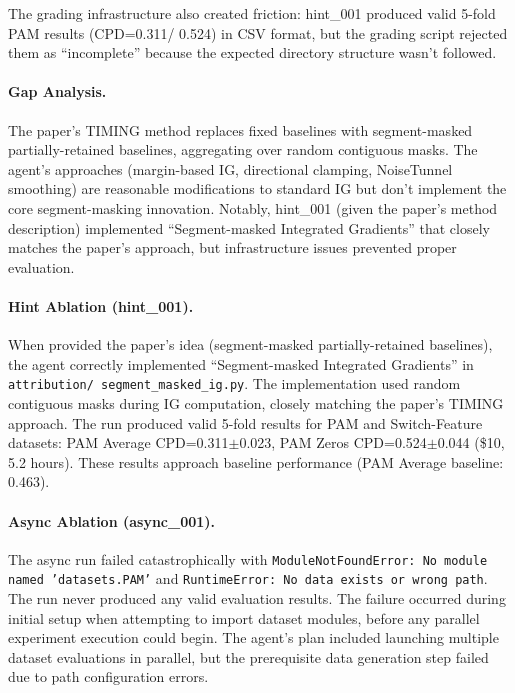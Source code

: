 \documentclass[11pt]{article}
\let\oldtexttt\texttt
\renewcommand{\texttt}[1]{{\fontseries{m}\selectfont\oldtexttt{#1}}}
\theoremstyle{plain}
\theoremstyle{definition}
\theoremstyle{remark}
\begin{document}
The grading infrastructure also created friction: hint\_001 produced valid 5-fold PAM results (CPD=0.311/ 0.524) in CSV format, but the grading script rejected them as ``incomplete'' because the expected directory structure wasn't followed.

\paragraph{Gap Analysis.} The paper's TIMING method replaces fixed baselines with segment-masked partially-retained baselines, aggregating over random contiguous masks. The agent's approaches (margin-based IG, directional clamping, NoiseTunnel smoothing) are reasonable modifications to standard IG but don't implement the core segment-masking innovation. Notably, hint\_001 (given the paper's method description) implemented ``Segment-masked Integrated Gradients'' that closely matches the paper's approach, but infrastructure issues prevented proper evaluation.

\paragraph{Hint Ablation (hint\_001).} When provided the paper's idea (segment-masked partially-retained baselines), the agent correctly implemented ``Segment-masked Integrated Gradients'' in \texttt{attribution/ segment\_masked\_ig.py}. The implementation used random contiguous masks during IG computation, closely matching the paper's TIMING approach. The run produced valid 5-fold results for PAM and Switch-Feature datasets: PAM Average CPD=0.311$\pm$0.023, PAM Zeros CPD=0.524$\pm$0.044 (\$10, 5.2 hours). These results approach baseline performance (PAM Average baseline: 0.463).

\paragraph{Async Ablation (async\_001).} The async run failed catastrophically with \texttt{ModuleNotFoundError: No module named 'datasets.PAM'} and \texttt{RuntimeError: No data exists or wrong path}. The run never produced any valid evaluation results. The failure occurred during initial setup when attempting to import dataset modules, before any parallel experiment execution could begin. The agent's plan included launching multiple dataset evaluations in parallel, but the prerequisite data generation step failed due to path configuration errors.

\newpage
\end{document}
